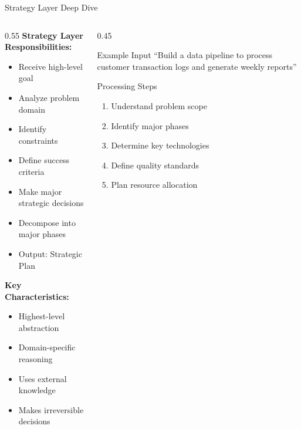 \documentclass[aspectratio=169,11pt]{beamer}
\begin{document}
\begin{frame}{Strategy Layer Deep Dive}
    \begin{columns}[T]
        \begin{column}{0.55\textwidth}
            \textbf{Strategy Layer Responsibilities:}
            \begin{itemize}
                \item Receive high-level goal
                \item Analyze problem domain
                \item Identify constraints
                \item Define success criteria
                \item Make major strategic decisions
                \item Decompose into major phases
                \item Output: Strategic Plan
            \end{itemize}

            \vspace{0.3cm}
            \textbf{Key Characteristics:}
            \begin{itemize}
                \item Highest-level abstraction
                \item Domain-specific reasoning
                \item Uses external knowledge
                \item Makes irreversible decisions
            \end{itemize}
        \end{column}
        \begin{column}{0.45\textwidth}
            \begin{exampleblock}{Example Input}
                ``Build a data pipeline to process customer transaction logs and generate weekly reports''
            \end{exampleblock}

            \vspace{0.2cm}
            \begin{block}{Processing Steps}
                \begin{enumerate}
                    \item Understand problem scope
                    \item Identify major phases
                    \item Determine key technologies
                    \item Define quality standards
                    \item Plan resource allocation
                \end{enumerate}
            \end{block}
        \end{column}
    \end{columns}
\end{frame}
\end{document}
